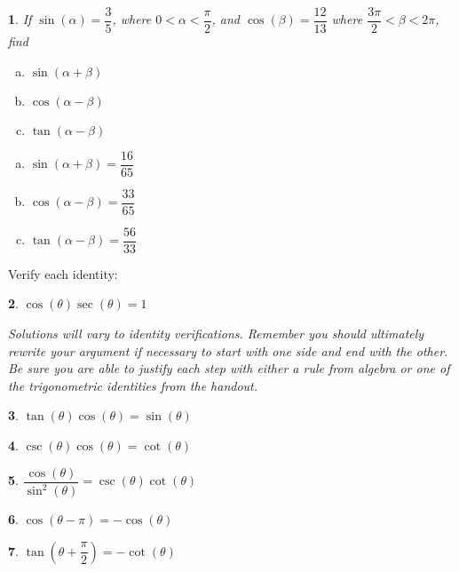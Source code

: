 \documentclass{amsbook}
\newcommand{\ssp}{\begin{enumerate}[(a), leftmargin=*]}
\newcommand{\esp}{\end{enumerate}}
\newtheorem{exc}{}
\newenvironment{ex}{\begin{exc}\normalfont}{\end{exc}}
\numberwithin{section}{chapter}
\numberwithin{equation}{chapter}
\begin{document}
\begin{ex}
	
If $\sin(\alpha) = \dfrac{3}{5}$, where $0 < \alpha < \dfrac{\pi}{2}$, and $\cos(\beta) = \dfrac{12}{13}$ where $\dfrac{3\pi}{2} < \beta < 2\pi$, find 

\begin{multicols}{3}
\ssp		
		\item $\sin(\alpha + \beta)$
		\item $\cos(\alpha - \beta)$
		\item $\tan(\alpha - \beta)$
	\esp	
\end{multicols}
	\begin{sol}
	\ssp
	\item $\sin(\alpha + \beta) = \dfrac{16}{65}$
	\item $\cos(\alpha - \beta) = \dfrac{33}{65}$
	\item $\tan(\alpha - \beta) = \dfrac{56}{33}$
	\esp	
	\end{sol}
\end{ex}

Verify each identity:

\begin{ex}
	$\cos(\theta) \sec(\theta) = 1$
		\begin{sol}
		Solutions will vary to identity verifications. Remember you should ultimately rewrite your argument if necessary to start with one side and end with the other. Be sure you are able to justify each step with either a rule from algebra or one of the trigonometric identities from the handout.
	\end{sol}
\end{ex}


\begin{ex}
	$\tan(\theta)\cos(\theta) = \sin(\theta)$
\end{ex}


\begin{ex}
	$\csc(\theta) \cos(\theta) = \cot(\theta)$ 
\end{ex}


\begin{ex}
	$\dfrac{\cos(\theta)}{\sin^{2}(\theta)} = \csc(\theta) \cot(\theta)$
\end{ex}

\begin{ex}
	$\cos(\theta - \pi) = -\cos(\theta)$
\end{ex}

\begin{ex}
	$\tan\left(\theta + \dfrac{\pi}{2} \right) = -\cot(\theta)$
\end{ex}
\end{document}
